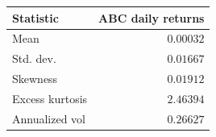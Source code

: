 \begin{tabular}{lr}
\toprule
Statistic & ABC daily returns \\
\midrule
Mean & $0.00032$ \\
Std. dev. & $0.01667$ \\
Skewness & $0.01912$ \\
Excess kurtosis & $2.46394$ \\
Annualized vol & $0.26627$ \\
\bottomrule
\end{tabular}
